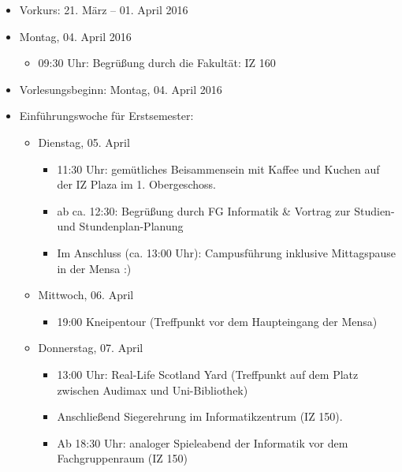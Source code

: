 \begin{itemize}
	\item Vorkurs: 21. März – 01. April 2016

	\item Montag, 04. April 2016
	\begin{itemize}
		\item 09:30 Uhr: Begrüßung durch die Fakultät: IZ 160
	\end{itemize}

	\item Vorlesungsbeginn: Montag, 04. April 2016

	\item Einführungswoche für Erstsemester:
	\begin{itemize}
		\item Dienstag, 05. April
		\begin{itemize}
			\item 11:30 Uhr: gemütliches Beisammensein mit Kaffee und Kuchen auf der IZ Plaza im 1. Obergeschoss.
			\item ab ca. 12:30: Begrüßung durch FG Informatik \& Vortrag zur Studien- und Stundenplan-Planung
			\item Im Anschluss (ca. 13:00 Uhr): Campusführung inklusive Mittagspause in der Mensa :)
		\end{itemize}

		\item Mittwoch, 06. April
		\begin{itemize}
			\item 19:00 Kneipentour (Treffpunkt vor dem Haupteingang der Mensa)
		\end{itemize}

		\item Donnerstag, 07. April
		\begin{itemize}
			\item 13:00 Uhr: Real-Life Scotland Yard (Treffpunkt auf dem Platz zwischen Audimax und Uni-Bibliothek)
			\item Anschließend Siegerehrung im Informatikzentrum (IZ 150).
			\item Ab 18:30 Uhr: analoger Spieleabend der Informatik vor dem Fachgruppenraum (IZ 150)
		\end{itemize}
	\end{itemize}


\end{itemize}
